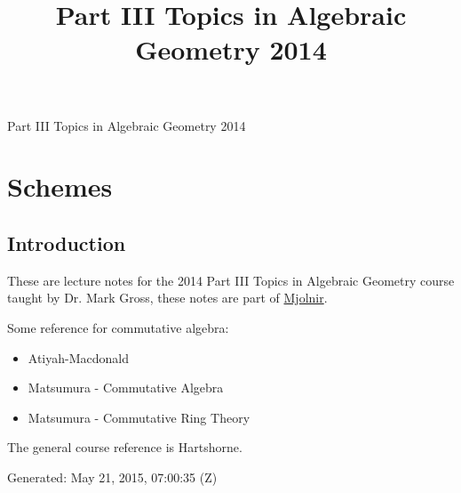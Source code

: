\documentclass[10pt,]{book}
\title{Part III Topics in Algebraic Geometry 2014}
\author{}
\date{}
\theoremstyle{plain}
\theoremstyle{definition}
\numberwithin{equation}{section}
\begin{document}
\frontmatter
\thispagestyle{empty}
\begin{center}
{\Huge Part III Topics in Algebraic Geometry 2014}
\end{center}\par
{}
\clearpage
\thispagestyle{empty}
\clearpage
\maketitle
\clearpage
\thispagestyle{empty}
\clearpage
\setcounter{tocdepth}{1}
\renewcommand*\contentsname{Contents}
\tableofcontents
\mainmatter
\typeout{************************************************}
\typeout{************************************************}
\chapter[Schemes]{Schemes}\label{chap-schemes}
\typeout{************************************************}
\typeout{************************************************}
\section[Introduction]{Introduction}\label{sec-introduction}
These are lecture notes for the 2014 Part III Topics in Algebraic Geometry course taught by Dr. Mark Gross, these notes are part of \href{https://alexjbest.github.io/mjolnir/}{Mjolnir}.%
\par
Some reference for commutative algebra:
          \begin{itemize}
\item{}Atiyah-Macdonald\item{}Matsumura - Commutative Algebra \item{}Matsumura - Commutative Ring Theory\end{itemize}

          The general course reference is Hartshorne.
\par

          Generated: May 21, 2015, 07:00:35 (Z)
\typeout{************************************************}
\typeout{************************************************}
\end{document}
